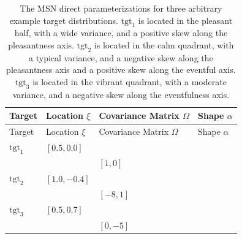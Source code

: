 \documentclass[
  authoryear,
  3p]{elsarticle}
\begin{document}
\begin{longtable}[]{@{}
  >{\centering\arraybackslash}p{}
  >{\centering\arraybackslash}p{}
  >{\centering\arraybackslash}p{}
  >{\centering\arraybackslash}p{}@{}}
\caption{The MSN direct parameterizations for three arbitrary example
target distributions. \(\text{tgt}_1\) is located in the pleasant half,
with a wide variance, and a positive skew along the pleasantness axis.
\(\text{tgt}_2\) is located in the calm quadrant, with a typical
variance, and a negative skew along the pleasantness axis and a positive
skew along the eventful axis. \(\text{tgt}_3\) is located in the vibrant
quadrant, with a moderate variance, and a negative skew along the
eventfulness axis.}\label{tbl-target-params}\tabularnewline
\toprule\noalign{}
\begin{minipage}[b]{\linewidth}\centering
Target
\end{minipage} & \begin{minipage}[b]{\linewidth}\centering
Location \(\xi\)
\end{minipage} & \begin{minipage}[b]{\linewidth}\centering
Covariance Matrix \(\Omega\)
\end{minipage} & \begin{minipage}[b]{\linewidth}\centering
Shape \(\alpha\)
\end{minipage} \\
\midrule\noalign{}
\endfirsthead
\toprule\noalign{}
\begin{minipage}[b]{\linewidth}\centering
Target
\end{minipage} & \begin{minipage}[b]{\linewidth}\centering
Location \(\xi\)
\end{minipage} & \begin{minipage}[b]{\linewidth}\centering
Covariance Matrix \(\Omega\)
\end{minipage} & \begin{minipage}[b]{\linewidth}\centering
Shape \(\alpha\)
\end{minipage} \\
\midrule\noalign{}
\endhead
\bottomrule\noalign{}
\endlastfoot
\(\text{tgt}_1\) & \([0.5, 0.0]\) &
\(\begin{bmatrix} 0.2 & 0.0 \\ 0.0 & 0.2 \end{bmatrix}\) & \([1, 0]\) \\
\(\text{tgt}_2\) & \([1.0, -0.4]\) &
\(\begin{bmatrix} 0.18 & -0.04 \\ -0.04 & 0.09 \end{bmatrix}\) &
\([-8, 1]\) \\
\(\text{tgt}_3\) & \([0.5, 0.7]\) &
\(\begin{bmatrix} 0.1 & 0.05 \\ 0.05 & 0.1 \end{bmatrix}\) &
\([0, -5]\) \\
\end{longtable}
\end{document}
